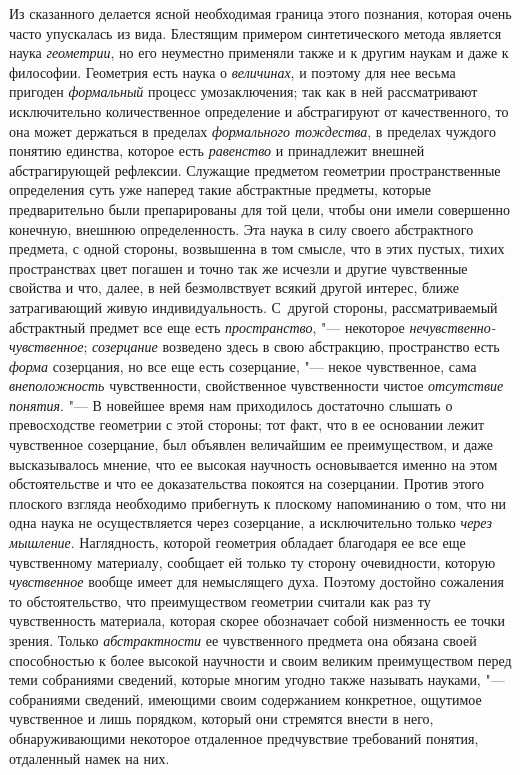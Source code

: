 {{Из сказанного делается ясной необходимая граница этого
познания, которая очень часто упускалась из вида. Блестящим примером
синтетического метода является наука
{\em геометрии}, но его
неуместно применяли также и к другим наукам и даже к философии. Геометрия
есть наука о {\em величинах},
и поэтому для нее весьма пригоден
{\em формальный} процесс
умозаключения; так как в ней рассматривают исключительно
количественное определение и абстрагируют от качественного, то она может
держаться в пределах {\em формального
тождества}, в пределах чуждого понятию единства, которое
есть {\em равенство} и
принадлежит внешней абстрагирующей рефлексии. Служащие предметом геометрии
пространственные определения суть уже наперед такие абстрактные предметы,
которые предварительно были препарированы для той цели, чтобы они имели
совершенно конечную, внешнюю определенность. Эта наука в силу своего
абстрактного предмета, с одной стороны, возвышенна в том смысле, что в этих
пустых, тихих пространствах цвет погашен и точно так же исчезли и другие
чувственные свойства и что, далее, в ней безмолвствует всякий другой
интерес, ближе затрагивающий живую индивидуальность. С~другой стороны,
рассматриваемый абстрактный предмет все еще есть
{\em пространство}, "---
некоторое
{\em нечувственно-чувственное};
{\em созерцание} возведено
здесь в свою абстракцию, пространство есть
{\em форма} созерцания,
но все еще есть созерцание, "--- некое чувственное, сама
{\em внеположность}
чувственности, свойственное чувственности чистое
{\em отсутствие понятия}. "---
В новейшее время нам приходилось достаточно слышать о
превосходстве геометрии с этой стороны; тот факт, что в ее основании лежит
чувственное созерцание, был объявлен величайшим ее преимуществом, и даже
высказывалось мнение, что ее высокая научность основывается именно на этом
обстоятельстве и что ее доказательства покоятся на
созерцании.
Против этого плоского взгляда необходимо прибегнуть к
плоскому напоминанию о том, что ни одна наука не осуществляется через
созерцание, а исключительно только
{\em через мышление}.
Наглядность, которой геометрия обладает благодаря ее все еще
чувственному материалу, сообщает ей только ту сторону очевидности, которую
{\em чувственное} вообще
имеет для немыслящего духа. Поэтому достойно сожаления то обстоятельство,
что преимуществом геометрии считали как раз ту чувственность материала,
которая скорее обозначает собой низменность ее точки зрения. Только
{\em абстрактности} ее
чувственного предмета она обязана своей способностью к более высокой
научности и своим великим преимуществом перед теми собраниями сведений,
которые многим угодно также называть науками, "--- собраниями
сведений, имеющими своим содержанием конкретное, ощутимое чувственное и
лишь порядком, который они стремятся внести в него, обнаруживающими
некоторое отдаленное предчувствие требований понятия, отдаленный намек на
них.

}}
